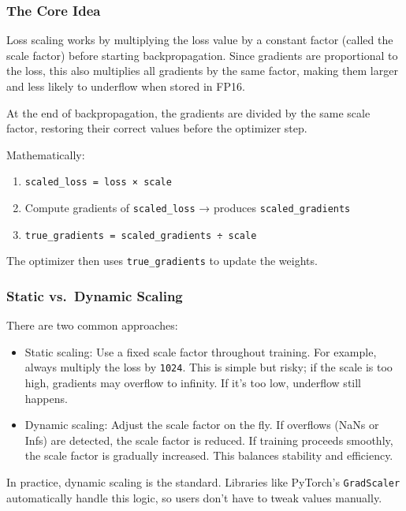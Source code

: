 \documentclass[
  letterpaper,
  DIV=11,
  numbers=noendperiod]{scrreprt}
\providecommand{\tightlist}{%
  \setlength{\itemsep}{0pt}\setlength{\parskip}{0pt}}
\begin{document}
\subsubsection{The Core Idea}\label{the-core-idea-2}

Loss scaling works by multiplying the loss value by a constant factor
(called the scale factor) before starting backpropagation. Since
gradients are proportional to the loss, this also multiplies all
gradients by the same factor, making them larger and less likely to
underflow when stored in FP16.

At the end of backpropagation, the gradients are divided by the same
scale factor, restoring their correct values before the optimizer step.

Mathematically:

\begin{enumerate}
\def\labelenumi{\arabic{enumi}.}
\tightlist
\item
  \texttt{scaled\_loss\ =\ loss\ ×\ scale}
\item
  Compute gradients of \texttt{scaled\_loss} → produces
  \texttt{scaled\_gradients}
\item
  \texttt{true\_gradients\ =\ scaled\_gradients\ ÷\ scale}
\end{enumerate}

The optimizer then uses \texttt{true\_gradients} to update the weights.

\subsubsection{Static vs.~Dynamic
Scaling}\label{static-vs.-dynamic-scaling}

There are two common approaches:

\begin{itemize}
\tightlist
\item
  Static scaling: Use a fixed scale factor throughout training. For
  example, always multiply the loss by \texttt{1024}. This is simple but
  risky; if the scale is too high, gradients may overflow to infinity.
  If it's too low, underflow still happens.
\item
  Dynamic scaling: Adjust the scale factor on the fly. If overflows
  (NaNs or Infs) are detected, the scale factor is reduced. If training
  proceeds smoothly, the scale factor is gradually increased. This
  balances stability and efficiency.
\end{itemize}

In practice, dynamic scaling is the standard. Libraries like PyTorch's
\texttt{GradScaler} automatically handle this logic, so users don't have
to tweak values manually.
\end{document}
